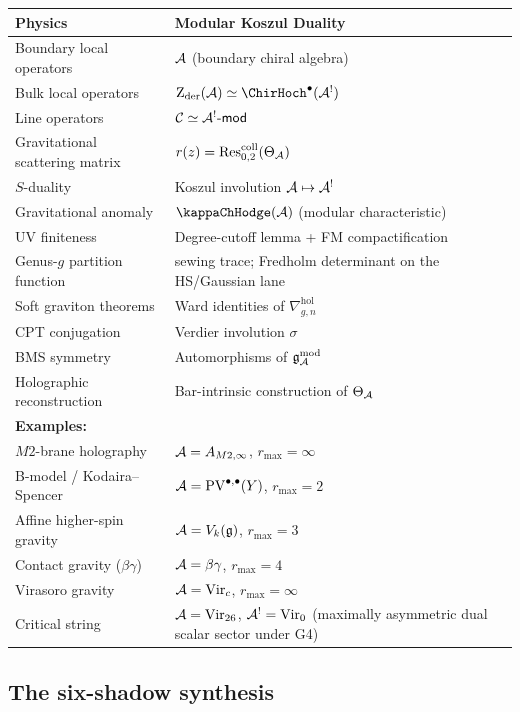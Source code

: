 \begin{center}
\renewcommand{\arraystretch}{1.3}
\small
\begin{tabular}{p{5cm}p{6.5cm}}
\textbf{Physics}
 & \textbf{Modular Koszul Duality} \\
\hline
Boundary local operators
 & $\mathcal{A}$ (boundary chiral algebra) \\
Bulk local operators
 & $\Zder(\cA) \simeq \ChirHoch^\bullet(\cA^!)$ \\
Line operators
 & $\mathcal{C} \simeq \mathcal{A}^!\text{-}\mathsf{mod}$ \\
Gravitational scattering matrix
 & $r(z) = \operatorname{Res}^{\mathrm{coll}}_{0,2}(\Theta_{\mathcal{A}})$ \\
$S$-duality
 & Koszul involution $\mathcal{A} \mapsto \mathcal{A}^!$ \\
Gravitational anomaly
 & $\kappaChHodge(\cA)$ (modular characteristic) \\
UV finiteness
 & Degree-cutoff lemma + FM compactification \\
Genus-$g$ partition function
 & sewing trace; Fredholm determinant on the HS/Gaussian lane \\
Soft graviton theorems
 & Ward identities of $\nabla^{\mathrm{hol}}_{g,n}$ \\
CPT conjugation
 & Verdier involution $\sigma$ \\
BMS symmetry
 & Automorphisms of $\mathfrak{g}_{\mathcal{A}}^{\mathrm{mod}}$ \\
Holographic reconstruction
 & Bar-intrinsic construction of $\Theta_{\mathcal{A}}$ \\[2pt]
\hline
\multicolumn{2}{l}{\textbf{Examples:}} \\
\hline
$M2$-brane holography
 & $\mathcal{A} = A_{M2,\infty}$, $r_{\max} = \infty$ \\
B-model / Kodaira--Spencer
 & $\mathcal{A} = \operatorname{PV}^{\bullet,\bullet}(Y)$, $r_{\max} = 2$ \\
Affine higher-spin gravity
 & $\mathcal{A} = V_k(\mathfrak{g})$, $r_{\max} = 3$ \\
Contact gravity ($\beta\gamma$)
 & $\mathcal{A} = \beta\gamma$, $r_{\max} = 4$ \\
Virasoro gravity
 & $\mathcal{A} = \mathrm{Vir}_c$, $r_{\max} = \infty$ \\
Critical string
 & $\mathcal{A} = \mathrm{Vir}_{26}$, $\mathcal{A}^! = \mathrm{Vir}_0$ (maximally asymmetric dual scalar sector under G4)
\end{tabular}
\end{center}


\subsection{The six-shadow synthesis}

